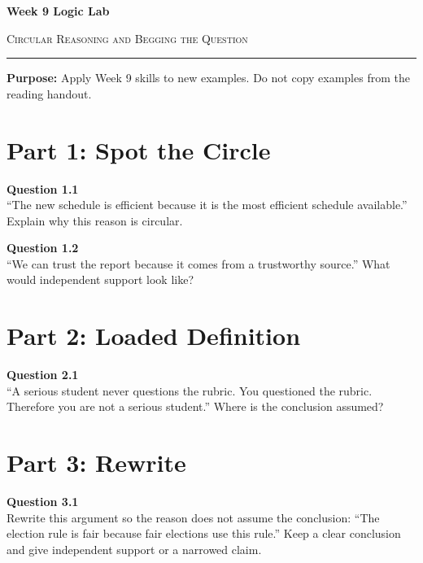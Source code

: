 \documentclass[12pt]{article}
\begin{document}
\begin{center}
{\LARGE\bfseries Week 9 Logic Lab}\par\vspace{0.05em}
{\large\scshape Circular Reasoning and Begging the Question}\par\vspace{0.1em}
\rule{0.78\textwidth}{0.5pt}\par\vspace{0.15em}
\end{center}

\noindent\textbf{Purpose:} Apply Week 9 skills to new examples. Do not copy examples from the reading handout.

\vspace{0.3em}

\section*{Part 1: Spot the Circle}

\textbf{Question 1.1}\\[-0.15em]
``The new schedule is efficient because it is the most efficient schedule available.'' Explain why this reason is circular.


\textbf{Question 1.2}\\[-0.15em]
``We can trust the report because it comes from a trustworthy source.'' What would independent support look like?


\newpage

\section*{Part 2: Loaded Definition}

\textbf{Question 2.1}\\[-0.15em]
``A serious student never questions the rubric. You questioned the rubric. Therefore you are not a serious student.'' Where is the conclusion assumed?


\newpage

\section*{Part 3: Rewrite}

\textbf{Question 3.1}\\[-0.15em]
Rewrite this argument so the reason does not assume the conclusion: ``The election rule is fair because fair elections use this rule.'' Keep a clear conclusion and give independent support or a narrowed claim.
\end{document}
